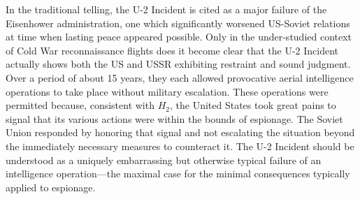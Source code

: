 \documentclass[14pt]{extarticle}
\begin{document}
In the traditional telling, the U-2 Incident is cited as a major failure of the Eisenhower administration, one which significantly worsened US-Soviet relations at time when lasting peace appeared possible. Only in the under-studied context of Cold War reconnaissance flights does it become clear that the U-2 Incident actually shows both the US and USSR exhibiting restraint and sound judgment. Over a period of about 15 years, they each allowed provocative aerial intelligence operations to take place without military escalation. These operations were permitted because, consistent with $H_2$, the United States took great pains to signal that its various actions were within the bounds of espionage. The Soviet Union responded by honoring that signal and not escalating the situation beyond the immediately necessary measures to counteract it. The U-2 Incident should be understood as a uniquely embarrassing but otherwise typical failure of an intelligence operation---the maximal case for the minimal consequences typically applied to espionage.


\end{document}
